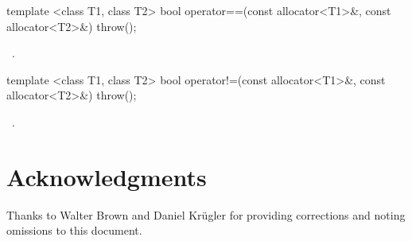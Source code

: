 \documentclass[american,twoside]{book}
\begin{document}
\begin{itemdecl}
template <class T1, class T2>
  bool operator==(const allocator<T1>&, const allocator<T2>&) throw();
\end{itemdecl}

\begin{itemdescr}
\pnum
\returns\ 
.
\end{itemdescr}

\begin{itemdecl}
template <class T1, class T2>
  bool operator!=(const allocator<T1>&, const allocator<T2>&) throw();
\end{itemdecl}

\begin{itemdescr}
\pnum
\returns\ 
.
\end{itemdescr}


\section*{Acknowledgments}
Thanks to Walter Brown and Daniel Kr\"ugler for providing corrections
and noting omissions to this document. 



\end{document}
